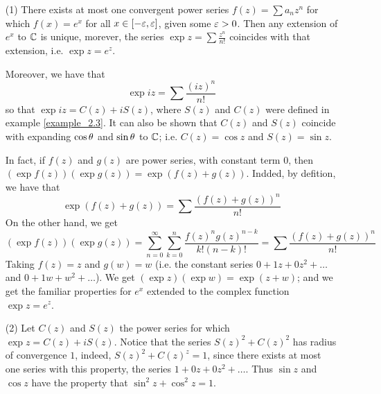 \begin{example}\label{example_2.6}
    \begin{enumerate}
        \item[(1)] There exists at most one convergent power series
            $f(z)=\sum{a_nz^n}$ for which $f(x)=e^x$ for all $x \in [-\varepsilon,\varepsilon]$,
            given some $\varepsilon>0$. Then any extension of  $e^x$ to  $\mathbb{C}$ is unique,
            morever, the series $\exp{z}=\sum{\frac{z^n}{n!}}$ coincides with
            that extension, i.e. $\exp{z}=e^z$.

            Moreover, we have that
            \begin{equation*}
                \exp{iz}=\sum{\frac{(iz)^n}{n!}}
            \end{equation*}
            so that $\exp{iz}=C(z)+iS(z)$, where $S(z)$ and $C(z)$ were defined
            in example \ref{example_2.3}. It can also be shown that $C(z)$ and
            $S(z)$ coincide with expanding $\cos{\theta}$ and $\sin{\theta}$ to $\mathbb{C}$;
            i.e. $C(z)=\cos{z}$ and $S(z)=\sin{z}$.

            In fact, if $f(z)$ and $g(z)$ are power series, with constant term
            $0$, then  $(\exp{f(z)})(\exp{g(z)})=\exp{(f(z)+g(z))}$. Indded, by
            defition, we have that
            \begin{equation*}
                \exp{(f(z)+g(z))}=\sum{\frac{(f(z)+g(z))^n}{n!}}
            \end{equation*}
            On the other hand, we get
            \begin{equation*}
                (\exp{f(z)})(\exp{g(z)})=
                \sum_{n=0}^\infty{\sum_{k=0}^n{\frac{f(z)^ng(z)^{n-k}}{k!(n-k)!}}}
                =\sum{\frac{(f(z)+g(z))^n}{n!}}
            \end{equation*}
            Taking $f(z)=z$ and $g(w)=w$ (i.e. the constant series
            $0+1z+0z^2+\dots$ and $0+1w+w^2+\dots$). We get
            $(\exp{z})(\exp{w})=\exp{(z+w)}$; and we get the familiar properties
            for $e^x$ extended to the complex function  $\exp{z}=e^z$.

        \item[(2)] Let $C(z)$ and $S(z)$ the power series for which
            $\exp{z}=C(z)+iS(z)$. Notice that the series $S(z)^2+C(z)^2$ has
            radius of convergence $1$, indeed,  $S(z)^2+C(z)^z=1$, since there
            exists at most one series with this property, the series
            $1+0z+0z^2+\dots$. Thus  $\sin{z}$ and $\cos{z}$ have the property
            that $\sin^2{z}+\cos^2{z}=1$.


\end{enumerate}
\end{example}
